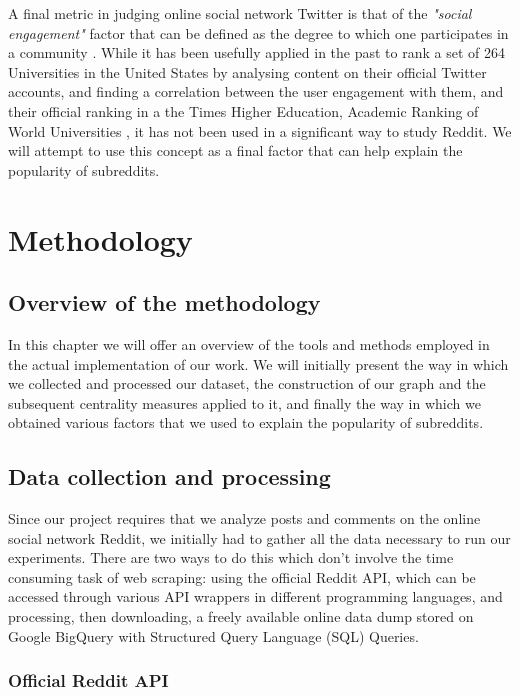 \documentclass[bsc,frontabs,twoside,singlespacing,parskip,deptreport]{infthesis}
\begin{document}
A final metric in judging online social network Twitter is that of the \textit{"social engagement"} factor that can be defined as the degree to which one participates in a community \cite{sentiment8}. While it has been usefully applied in the past to rank a set of 264 Universities in the United States by analysing content on their official Twitter accounts, and finding a correlation between the user engagement with them, and their official ranking in a the Times Higher Education, Academic Ranking of World Universities \cite{sentiment9}, it has not been used in a significant way to study Reddit. We will attempt to use this concept as a final factor that can help explain the popularity of subreddits.


\chapter{Methodology}\label{methodology}

\section{Overview of the methodology}\label{method-overview}

In this chapter we will offer an overview of the tools and methods employed in the actual implementation of our work. We will initially present the way in which we collected and processed our dataset, the construction of our graph and the subsequent centrality measures applied to it, and finally the way in which we obtained various factors that we used to explain the popularity of subreddits.

\section{Data collection and processing}\label{data}

Since our project requires that we analyze posts and comments on the online social network Reddit, we initially had to gather all the data necessary to run our experiments. There are two ways to do this which don't involve the time consuming task of web scraping: using the official Reddit API, which can be accessed through various API wrappers in different programming languages, and processing, then downloading, a freely available online data dump stored on Google BigQuery with Structured Query Language (SQL) Queries.

\subsection{Official Reddit API}\label{reddit-api}
\end{document}
